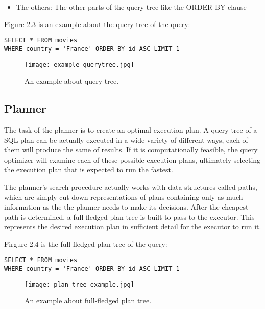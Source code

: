 \begin{flushleft}
\begin{itemize}
\item The others: The other parts of the query tree like the ORDER BY clause
\end{itemize}
{\justify
Figure 2.3 is an example about the query tree of the query:
\begin{verbatim}
SELECT * FROM movies 
WHERE country = 'France' ORDER BY id ASC LIMIT 1
\end{verbatim}
}
\begin{figure}[H]
\centering
\texttt{[image: example\_querytree.jpg]}
\caption{An example about query tree.}
\end{figure}
\end{flushleft}
\subsection{Planner}
\begin{flushleft}
{\justify
The task of the planner \cite{Flow of a select statement} is to create an optimal execution plan. A query tree of a SQL plan can be actually executed in a wide variety of different ways, each of them will produce the same of results. If it is computationally feasible, the query optimizer will examine each of these possible execution plans, ultimately selecting the execution plan that is expected to run the fastest.
\par }
\vspace{0.5cm}
{\justify
The planner's search procedure actually works with data structures called paths, which are simply cut-down representations of plans containing only as much information as the the planner needs to make its decisions. After the cheapest path is determined, a full-fledged plan tree is built to pass to the executor. This represents the desired execution plan in sufficient detail for the executor to run it.
\par }
{\justify
Firgure 2.4 is the full-fledged plan tree of the query:
\begin{verbatim}
SELECT * FROM movies 
WHERE country = 'France' ORDER BY id ASC LIMIT 1
\end{verbatim}
\par }
\begin{figure}[H]
\centering
\texttt{[image: plan\_tree\_example.jpg]}
\caption{An example about full-fledged plan tree.}
\end{figure}
\vspace{0.5cm}
\end{flushleft}
